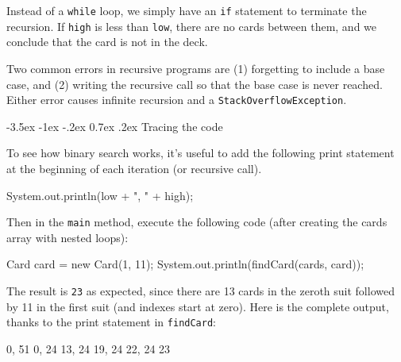\documentclass[12pt]{book}
\makeatletter
\renewcommand{\section}{\@startsection {section}{1}{\z@}%
    {-3.5ex \@plus -1ex \@minus -.2ex}%
    {0.7ex \@plus.2ex}%
    {\normalfont\Large\bfseries}}
\theoremstyle{exercise}
\newcommand{\java}[1]{\lstinline{#1}} %
\makeatother
\begin{document}

Instead of a \java{while} loop, we simply have an \java{if} statement to terminate the recursion.
If \java{high} is less than \java{low}, there are no cards between them, and we conclude that the card is not in the deck.


Two common errors in recursive programs are (1) forgetting to include a base case, and (2) writing the recursive call so that the base case is never reached.
Either error causes infinite recursion and a \java{StackOverflowException}.

\section{Tracing the code}

To see how binary search works, it's useful to add the following print statement at the beginning of each iteration (or recursive call).

\begin{code}
    System.out.println(low + ", " + high);
\end{code}


Then in the \java{main} method, execute the following code (after creating the cards array with nested loops):

\begin{code}
    Card card = new Card(1, 11);
    System.out.println(findCard(cards, card));
\end{code}

The result is \java{23} as expected, since there are 13 cards in the zeroth suit followed by 11 in the first suit (and indexes start at zero).
Here is the complete output, thanks to the print statement in \java{findCard}:

\begin{stdout}
0, 51
0, 24
13, 24
19, 24
22, 24
23
\end{stdout}
\end{document}
